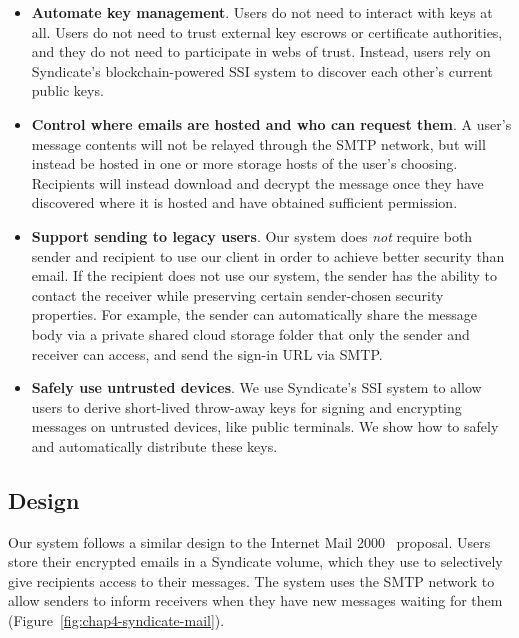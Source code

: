 \begin{itemize}
\item \textbf{Automate key management}.  Users do not need to interact with keys
at all.  Users do not need to trust external key escrows or certificate
authorities, and they do not need to participate in webs of trust.  Instead,
users rely on Syndicate's blockchain-powered SSI system to discover each other's
current public keys.

\item \textbf{Control where emails are hosted and who can request them}.
A user's message contents will
not be relayed through the SMTP network, but will instead be hosted in one or
more storage hosts of the user's choosing.  Recipients will instead download and
decrypt the message once they have discovered where it is hosted and have
obtained sufficient permission.

\item \textbf{Support sending to legacy users}.  Our system does \emph{not}
require both sender and recipient to use our client in order to achieve
better security than email.  If the recipient does not use our system, the sender has
the ability to contact the receiver while
preserving certain sender-chosen security properties.  For example, 
the sender can automatically share the message body via a private shared cloud storage folder
that only the sender and receiver can access, and send the sign-in URL via SMTP.

\item \textbf{Safely use untrusted devices}.  We use Syndicate's SSI system to
allow users to derive short-lived throw-away keys for signing and encrypting
messages on untrusted devices, like public terminals.  We show how to safely and automatically
distribute these keys.
\end{itemize}

\subsection{Design}

Our system follows a similar design to the Internet Mail
2000~\cite{internet-mail-2000}
proposal.  Users store their encrypted emails in a Syndicate volume, which they
use to selectively give recipients access to their messages.  The system uses
the SMTP network to allow senders to inform receivers when they have new
messages waiting for them (Figure~\ref{fig:chap4-syndicate-mail}).

